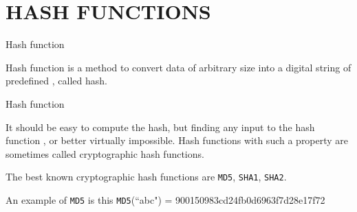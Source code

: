 \documentclass[serif]{beamer}
\begin{document}
\section{HASH FUNCTIONS}
\begin{frame}{Hash function}
	\begin{definition}
		Hash function is a method to convert data of arbitrary size
		into a digital string of predefined {\color{red}{fixed length}}, called hash.
	\end{definition}
\end{frame}
\begin{frame}{Hash function}
		\begin{definition}
			It should be easy to compute the hash, but finding any input to the hash
			function {\color{red}{must be difficult}}, or better virtually impossible. Hash functions with such a property are sometimes called
			cryptographic hash functions.
		\end{definition}
\end{frame}
\begin{frame}
	The best known cryptographic hash functions are
	{\tt MD5}, {\tt SHA1}, {\tt SHA2}. 
	\begin{example}
		An example of {\tt MD5} is this
		{\tt MD5}(``abc") = 900150983cd24fb0d6963f7d28e17f72
	\end{example}
\end{frame}
\end{document}
